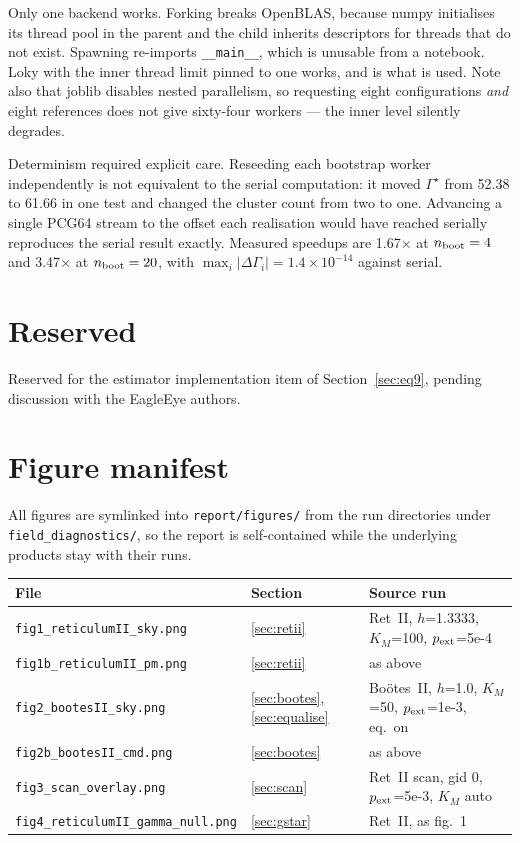 \documentclass[11pt,a4paper]{article}
\newcommand{\Ups}{\Upsilon}                  %
\newcommand{\Gam}{\Gamma}                    %
\newcommand{\Ups}{\Upsilon}
\newcommand{\Gam}{\Gamma}
\newcommand{\Gstar}{\Gamma^{\star}}
\begin{document}
Only one backend works. Forking breaks OpenBLAS, because numpy initialises its thread pool in the
parent and the child inherits descriptors for threads that do not exist. Spawning re-imports
\texttt{\_\_main\_\_}, which is unusable from a notebook. Loky with the inner thread limit pinned to
one works, and is what is used. Note also that joblib disables nested parallelism, so requesting
eight configurations \emph{and} eight references does not give sixty-four workers --- the inner
level silently degrades.

Determinism required explicit care. Reseeding each bootstrap worker independently is not equivalent
to the serial computation: it moved $\Gstar$ from 52.38 to 61.66 in one test and changed the cluster
count from two to one. Advancing a single PCG64 stream to the offset each realisation would have
reached serially reproduces the serial result exactly. Measured speedups are 1.67$\times$ at
$n_{\rm boot} = 4$ and 3.47$\times$ at $n_{\rm boot} = 20$, with
$\max_i |\Delta\Gam_i| = 1.4\times10^{-14}$ against serial.

\section{Reserved}
\label{app:reserved}

Reserved for the estimator implementation item of Section~\ref{sec:eq9}, pending discussion with
the EagleEye authors.

\section{Figure manifest}
\label{app:figures}

All figures are symlinked into \texttt{report/figures/} from the run directories under
\texttt{field\_diagnostics/}, so the report is self-contained while the underlying products stay
with their runs.

\begin{table}[h]
\centering\small
\begin{tabular}{@{}lll@{}}
\toprule
File & Section & Source run\\
\midrule
\texttt{fig1\_reticulumII\_sky.png} & \ref{sec:retii} &
  Ret~II, $h$=1.3333, $K_M$=100, $p_{\rm ext}$=5e-4\\
\texttt{fig1b\_reticulumII\_pm.png} & \ref{sec:retii} & as above\\
\texttt{fig2\_bootesII\_sky.png} & \ref{sec:bootes}, \ref{sec:equalise} &
  Bo\"otes~II, $h$=1.0, $K_M$=50, $p_{\rm ext}$=1e-3, eq.\ on\\
\texttt{fig2b\_bootesII\_cmd.png} & \ref{sec:bootes} & as above\\
\texttt{fig3\_scan\_overlay.png} & \ref{sec:scan} &
  Ret~II scan, gid 0, $p_{\rm ext}$=5e-3, $K_M$ auto\\
\texttt{fig4\_reticulumII\_gamma\_null.png} & \ref{sec:gstar} & Ret~II, as fig.\ 1\\
\bottomrule
\end{tabular}
\end{table}
\end{document}
